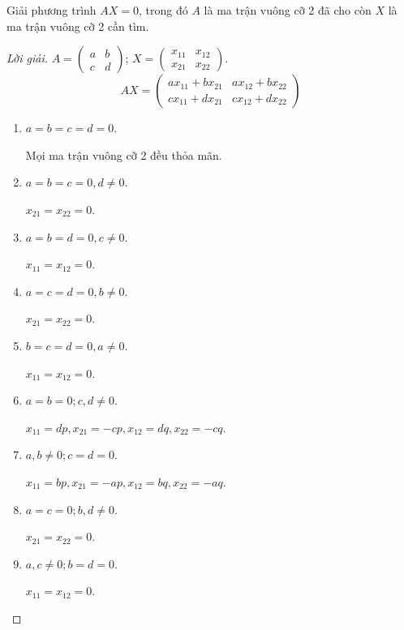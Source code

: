 \documentclass[class=nhvh-linear-algebra,crop=false]{standalone}
\begin{document}
\begin{exercise}
    Giải phương trình $AX = 0$, trong đó $A$ là ma trận vuông cỡ 2 đã cho còn $X$ là ma trận vuông cỡ 2 cần tìm.
\end{exercise}

\begin{proof}[Lời giải]
    $A = \begin{pmatrix}a & b \\ c & d\end{pmatrix}$; $X = \begin{pmatrix}x_{11} & x_{12} \\ x_{21} & x_{22}\end{pmatrix}$.
    \[
        AX =
        \begin{pmatrix}
            ax_{11}+bx_{21} & ax_{12}+bx_{22} \\
            cx_{11}+dx_{21} & cx_{12}+dx_{22}
        \end{pmatrix}
    \]
    \begin{enumerate}[label = Trường hợp \arabic*:,itemindent=2cm]
        \item $a = b = c = d = 0$.
              \par Mọi ma trận vuông cỡ 2 đều thỏa mãn.
        \item $a = b = c = 0, d\ne 0$.
              \par $x_{21} = x_{22} = 0$.
        \item $a = b = d = 0, c\ne 0$.
              \par $x_{11} = x_{12} = 0$.
        \item $a = c = d = 0, b\ne 0$.
              \par $x_{21} = x_{22} = 0$.
        \item $b = c = d = 0, a\ne 0$.
              \par $x_{11} = x_{12} = 0$.
        \item $a = b = 0; c, d\ne 0$.
              \par $x_{11} = dp, x_{21} = -cp, x_{12} = dq, x_{22} = -cq$.
        \item $a, b\ne 0; c = d = 0$.
              \par $x_{11} = bp, x_{21} = -ap, x_{12} = bq, x_{22} = -aq$.
        \item $a = c = 0; b, d\ne 0$.
              \par $x_{21} = x_{22} = 0$.
        \item $a, c\ne 0; b = d = 0$.
              \par $x_{11} = x_{12} = 0$.

\end{enumerate}
\end{proof}
\end{document}
